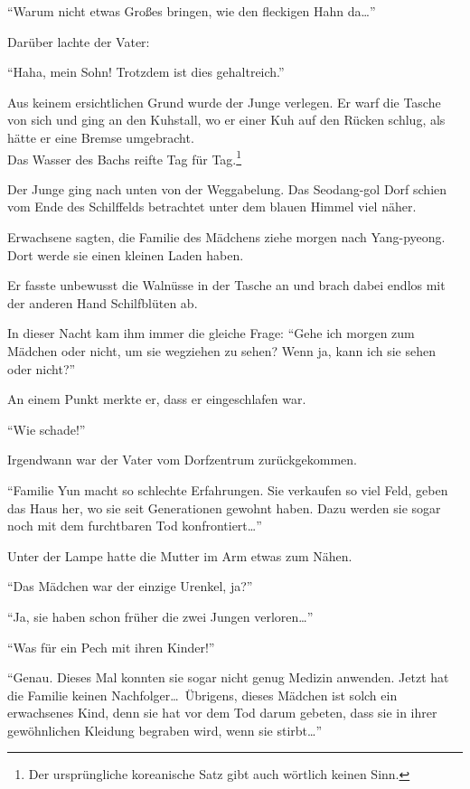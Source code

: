 \documentclass[prd,12pt,tightenlines,notitlepage,nofootinbib]{revtex4-1}
\begin{document}
"`Warum nicht etwas Großes bringen, wie den fleckigen Hahn da\ldots"'

Darüber lachte der Vater:

"`Haha, mein Sohn!
Trotzdem ist dies gehaltreich."'

Aus keinem ersichtlichen Grund wurde der Junge verlegen.
Er warf die Tasche von sich und ging an den Kuhstall,
wo er einer Kuh auf den Rücken schlug,
als hätte er eine Bremse umgebracht.
\\

Das Wasser des Bachs reifte Tag für Tag.\footnote{Der ursprüngliche
  koreanische Satz gibt auch wörtlich keinen Sinn.}

Der Junge ging nach unten von der Weggabelung.
Das Seodang-gol Dorf schien vom Ende des Schilffelds betrachtet
unter dem blauen Himmel viel näher.

Erwachsene sagten,
die Familie des Mädchens ziehe morgen nach Yang-pyeong.
Dort werde sie einen kleinen Laden haben.

Er fasste unbewusst die Walnüsse in der Tasche an und
brach dabei endlos mit der anderen Hand Schilfblüten ab.

In dieser Nacht kam ihm immer die gleiche Frage:
"`Gehe ich morgen zum Mädchen oder nicht, um sie wegziehen zu sehen?
Wenn ja, kann ich sie sehen oder nicht?"'

An einem Punkt merkte er, dass er eingeschlafen war.

"`Wie schade!"'

Irgendwann war der Vater vom Dorfzentrum zurückgekommen.

"`Familie Yun macht so schlechte Erfahrungen.
Sie verkaufen so viel Feld,
geben das Haus her, wo sie seit Generationen gewohnt haben.
Dazu werden sie sogar noch mit dem furchtbaren Tod konfrontiert\ldots"'

Unter der Lampe hatte die Mutter im Arm etwas zum Nähen.

"`Das Mädchen war der einzige Urenkel, ja?"'

"`Ja, sie haben schon früher die zwei Jungen verloren\ldots"'

"`Was für ein Pech mit ihren Kinder!"'

"`Genau.
Dieses Mal konnten sie sogar nicht genug Medizin anwenden.
Jetzt hat die Familie keinen Nachfolger\ldots\
Übrigens, dieses Mädchen ist solch ein erwachsenes Kind,
denn sie hat vor dem Tod darum gebeten,
dass sie in ihrer gewöhnlichen Kleidung begraben wird,
wenn sie stirbt\ldots"'
\end{document}
